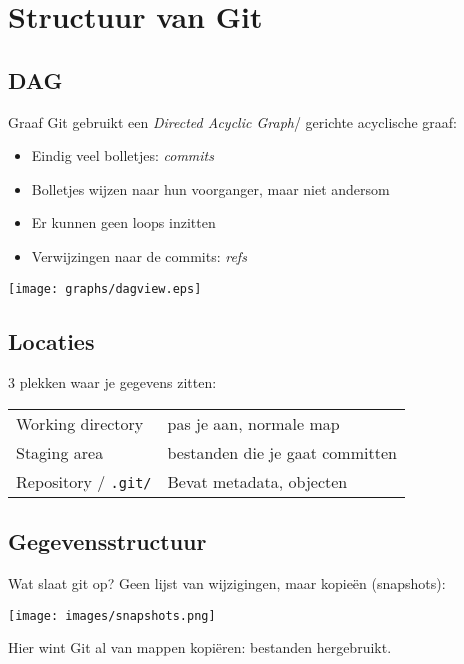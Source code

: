 \section[Structuur]{Structuur van Git}
\subsection{DAG}
\begin{frame}{Graaf}
	Git gebruikt een \emph{Directed Acyclic Graph}/ gerichte acyclische graaf:
	\begin{itemize}
		\item Eindig veel bolletjes: \emph{commits}
		\item Bolletjes wijzen naar hun voorganger, maar niet andersom
		\item Er kunnen geen loops inzitten
		\item Verwijzingen naar de commits: \emph{refs}
	\end{itemize}

	\begin{center}
		\texttt{[image: graphs/dagview.eps]}
	\end{center}
\end{frame}

\subsection{Locaties}
\begin{frame}
	3 plekken waar je gegevens zitten:\\
	\vspace{.5cm}
	\begin{tabular}{ll}
		 Working directory			& pas je aan, normale map\\
		 Staging area				& bestanden die je gaat committen\\
		 Repository / \texttt{.git/}&Bevat metadata, objecten
	\end{tabular}
\end{frame}

\subsection{Gegevensstructuur}
\begin{frame}{Wat slaat git op?}
	Geen lijst van wijzigingen, maar kopie\"en (snapshots):
	\begin{center}
		\texttt{[image: images/snapshots.png]}
	\end{center}
	{\footnotesize Hier wint Git al van mappen kopi\"eren: bestanden hergebruikt. }
\end{frame}

